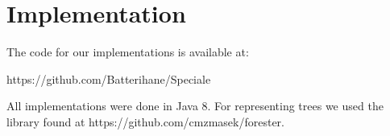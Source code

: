 \chapter{Implementation}
The code for our implementations is available at:

https://github.com/Batterihane/Speciale

All implementations were done in Java 8. For representing trees we used the library found at https://github.com/cmzmasek/forester.  


